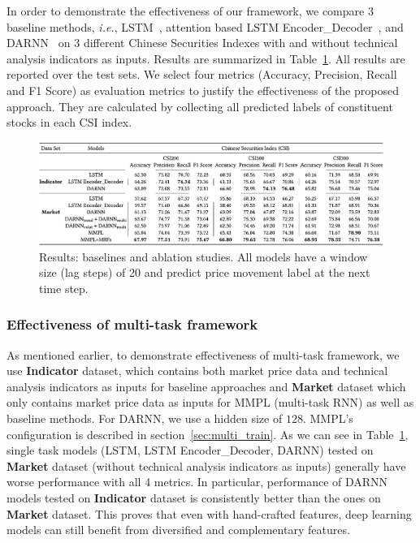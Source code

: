 In order to demonstrate the effectiveness of our framework, we
compare 3 baseline methods, \textit{i.e.},
LSTM~\cite{hochreiter1997long}, attention based LSTM
Encoder\_Decoder~\cite{attention}, and DARNN~\cite{qin2017dual}
on 3 different Chinese Securities Indexes with and without
technical analysis indicators as inputs. Results are summarized
in Table~\ref{tab:result}. All results are reported over the test
sets. We select four metrics (Accuracy, Precision, Recall and F1
Score) as evaluation metrics to justify the effectiveness of the
proposed approach. They are calculated by collecting all
predicted labels of constituent stocks in each CSI index.

\begin{figure}[t]
  \centering
  \includegraphics[width=1\columnwidth]{Methodology/figures/table_results.png}
  \caption{\label{tab:result} Results: baselines and ablation
    studies. All models have a window size (lag steps) of 20 and
    predict price movement label at the next time step.}
\end{figure}


\subsubsection{Effectiveness of multi-task framework}

As mentioned earlier, to demonstrate effectiveness of multi-task
framework, we use \textbf{Indicator} dataset, which contains both
market price data and technical analysis indicators as inputs for
baseline approaches and \textbf{Market} dataset which only
contains market price data as inputs for MMPL (multi-task RNN) as
well as baseline methods. For DARNN, we use a hidden size of
$128$. MMPL's configuration is described in
section~\ref{sec:multi_train}. As we can see in
Table~\ref{tab:result}, single task models (LSTM, LSTM
Encoder\_Decoder, DARNN) tested on \textbf{Market} dataset
(without technical analysis indicators as inputs) generally have
worse performance with all 4 metrics. In particular, performance of
DARNN models tested on \textbf{Indicator} dataset is consistently
better than the ones on \textbf{Market} dataset. This proves that
even with hand-crafted features, deep learning models can still
benefit from diversified and complementary features.

